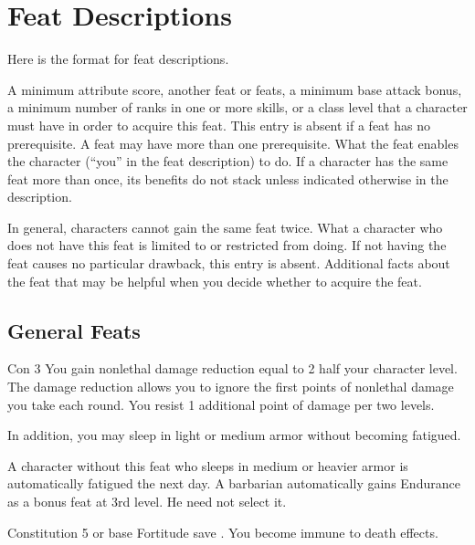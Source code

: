 \twocolumn

\section{Feat Descriptions}
Here is the format for feat descriptions.

 A minimum attribute score, another feat or feats, a minimum base attack bonus, a minimum number of ranks in one or more skills, or a class level that a character must have in order to acquire this feat. This entry is absent if a feat has no prerequisite. A feat may have more than one prerequisite.
 What the feat enables the character (``you'' in the feat description) to do. If a character has the same feat more than once, its benefits do not stack unless indicated otherwise in the description.
\par In general, characters cannot gain the same feat twice.
 What a character who does not have this feat is limited to or restricted from doing. If not having the feat causes no particular drawback, this entry is absent.
 Additional facts about the feat that may be helpful when you decide whether to acquire the feat.

\subsection{General Feats}

\featpre Con 3
 You gain nonlethal damage reduction equal to 2 \add half your character level. The damage reduction allows you to ignore the first points of nonlethal damage you take each round. You resist 1 additional point of damage per two levels.

In addition, you may sleep in light or medium armor without becoming fatigued.

 A character without this feat who sleeps in medium or heavier armor is automatically fatigued the next day.
 A barbarian automatically gains Endurance as a bonus feat at 3rd level. He need not select it.

\featpre Constitution 5 or base Fortitude save .
\featben You become immune to death effects.

